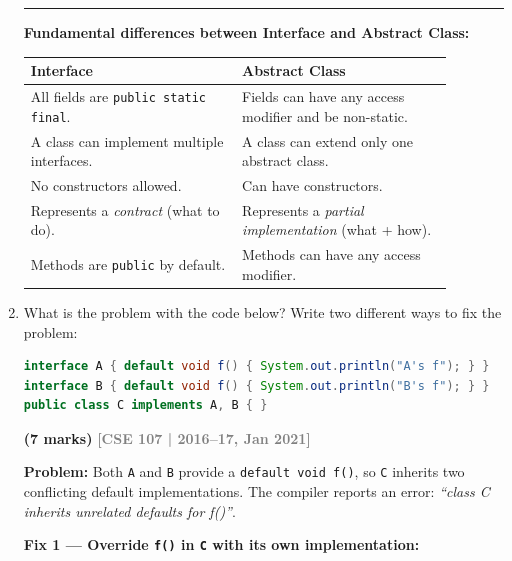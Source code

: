 \documentclass[12pt,a3paper]{article}
\newcommand{\yr}[1]{\hfill\textcolor{gray}{\small\textbf{[#1]}}}
\newcommand{\mk}[1]{\textcolor{orange!70!black}{\small\textbf{(#1 marks)}}}
\begin{document}
\begin{enumerate}
\begin{tcolorbox}
\medskip
\textcolor{cD}{\rule{\textwidth}{0.4pt}}

\textbf{Fundamental differences between Interface and Abstract Class:}

\begin{center}
\small
\begin{tabular}{@{}p{0.44\linewidth}p{0.44\linewidth}@{}}
\toprule
\textbf{Interface} & \textbf{Abstract Class} \\
\midrule
All fields are \texttt{public static final}. &
Fields can have any access modifier and be non-static. \\[4pt]
A class can implement multiple interfaces. &
A class can extend only one abstract class. \\[4pt]
No constructors allowed. &
Can have constructors. \\[4pt]
Represents a \emph{contract} (what to do). &
Represents a \emph{partial implementation} (what + how). \\[4pt]
Methods are \texttt{public} by default. &
Methods can have any access modifier. \\
\bottomrule
\end{tabular}
\end{center}

\end{tcolorbox}



\item What is the problem with the code below? Write two different ways to fix the problem:
\begin{lstlisting}[language=Java]
interface A { default void f() { System.out.println("A's f"); } }
interface B { default void f() { System.out.println("B's f"); } }
public class C implements A, B { }
\end{lstlisting}
\mk{7}
\yr{CSE 107 | 2016--17, Jan 2021}

\begin{tcolorbox}[enhanced,breakable,ansbox,
  colback=cD!4,colframe=cD,boxrule=0.8pt,arc=5pt,
  title={\textbf{Answer --- Default Method Conflict: Two Fixes}},
  fonttitle=\bfseries\color{white},colbacktitle=cD]

\textbf{Problem:} Both \texttt{A} and \texttt{B} provide a
\texttt{default void f()}, so \texttt{C} inherits two conflicting
default implementations. The compiler reports an error:
\textit{``class C inherits unrelated defaults for f()''}.

\medskip
\textbf{Fix 1 --- Override \texttt{f()} in \texttt{C} with its own implementation:}


\end{tcolorbox}
\end{enumerate}
\end{document}
